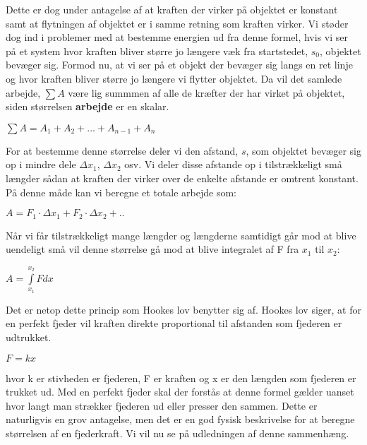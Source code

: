 \documentclass[12pt,a4paper]{article}
\theoremstyle{break}
\theoremstyle{nonumberplain}
\begin{document}
Dette er dog under antagelse af at kraften der virker på objektet er konstant samt at flytningen af objektet er i samme retning som kraften virker. 
Vi støder dog ind i problemer med at bestemme energien ud fra denne formel, hvis vi ser på et system hvor kraften bliver større jo længere væk fra startstedet, $s_0$, objektet bevæger sig. Formod nu, at vi ser på et objekt der bevæger sig langs en ret linje og hvor kraften bliver større jo længere vi flytter objektet. Da vil det samlede arbejde, $\sum A$ være lig summmen af alle de kræfter der har virket på objektet, siden størrelsen \textbf{arbejde} er en skalar.
\\
\begin{center}
$\sum A = A_1 + A_2 + ... + A_{n-1} + A_n$
\end{center}
\bigskip

For at bestemme denne størrelse deler vi den afstand, $s$, som objektet bevæger sig op i mindre dele $\Delta x_1$, $\Delta x_2$ osv. Vi deler disse afstande op i tilstrækkeligt små længder sådan at kraften der virker over de enkelte afstande er omtrent konstant. På denne måde kan vi beregne et totale arbejde som:
\\
\begin{center}
$A = F_1 \cdot \Delta x_1 + F_2 \cdot \Delta x_2 + ..$
\end{center}
\bigskip

Når vi får tilstrækkeligt mange længder og længderne samtidigt går mod at blive uendeligt små vil denne størrelse gå mod at blive integralet af F fra $x_1$ til $x_2$: 

\begin{center}
$A = \int\limits_{x_1}^{x_2} F dx$ 
\end{center}
\bigskip

Det er netop dette princip som Hookes lov benytter sig af. Hookes lov siger, at for en perfekt fjeder vil kraften direkte proportional til afstanden som fjederen er udtrukket. 

\begin{center}
$F = kx$
\end{center}
\bigskip

hvor k er stivheden er fjederen, F er kraften og x er den længden som fjederen er trukket ud. Med en perfekt fjeder skal der forstås at denne formel gælder uanset hvor langt man strækker fjederen ud eller presser den sammen. Dette er naturligvis en grov antagelse, men det er en god fysisk beskrivelse for at beregne størrelsen af en fjederkraft. Vi vil nu se på udledningen af denne sammenhæng.
\end{document}
